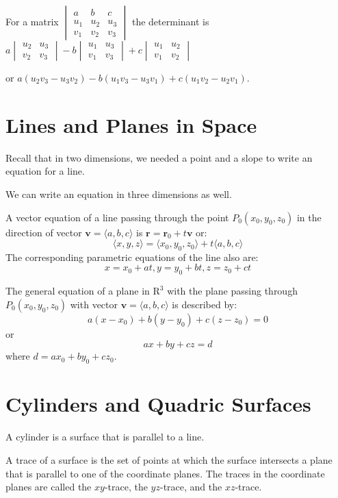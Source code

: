 \documentclass[../calc3.tex]{subfiles}
\begin{document}
For a matrix $\begin{vmatrix}
a & b & c\\
u_1 & u_2 & u_3\\
v_1 & v_2 & v_3
\end{vmatrix}$
the determinant is $a\begin{vmatrix}
    u_2 & u_3\\
    v_2 & v_3
\end{vmatrix}-b\begin{vmatrix}
    u_1 & u_3\\
    v_1 & v_3
\end{vmatrix}
+c\begin{vmatrix}
    u_1 & u_2\\
    v_1 & v_2
\end{vmatrix}$ 

or $a(u_2v_3-u_3v_2)-b(u_1v_3-u_3v_1)+c(u_1v_2-u_2v_1)$.
\section{Lines and Planes in Space}
Recall that in two dimensions, we needed a point and a slope to write an equation for a line.

We can write an equation in three dimensions as well.

A vector equation of a line passing through the point $P_0(x_0,y_0,z_0)$ in the direction of vector $\textbf{v}=\langle a,b,c \rangle$ is $\textbf{r}=\textbf{r}_0+t\textbf{v}$ or:
\[\langle x,y,z \rangle = \langle x_0,y_0,z_0 \rangle + t\langle a,b,c \rangle\]
The corresponding parametric equations of the line also are:
\[x=x_0+at, y=y_0+bt, z=z_0+ct\]

The general equation of a plane in $\mathrm{R}^3$ with the plane passing through $P_0(x_0,y_0,z_0)$ with vector $\textbf{v}=\langle a,b,c\rangle$ is described by:
\[a(x-x_0)+b(y-y_0)+c(z-z_0)=0\]
or 
\[ax+by+cz=d\] where $d=ax_0+by_0+cz_0$.
\section{Cylinders and Quadric Surfaces}
A cylinder is a surface that is parallel to a line.

A trace of a surface is the set of points at which the surface intersects a plane that is parallel to one of the coordinate planes. The traces in the coordinate planes are called the $xy$-trace, the $yz$-trace, and the $xz$-trace.
\end{document}

